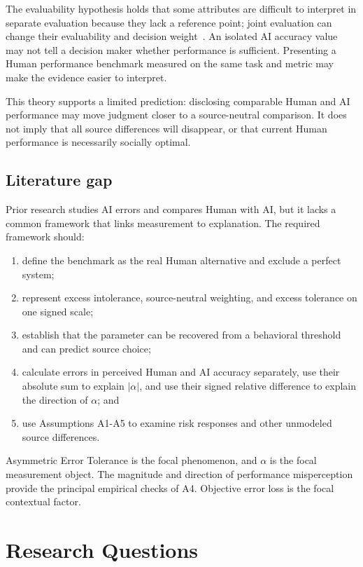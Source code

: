 \documentclass[11pt,a4paper]{article}
\begin{document}
The evaluability hypothesis holds that some attributes are difficult to interpret in separate evaluation because they lack a reference point; joint evaluation can change their evaluability and decision weight~\citep{hsee1996}. An isolated AI accuracy value may not tell a decision maker whether performance is sufficient. Presenting a Human performance benchmark measured on the same task and metric may make the evidence easier to interpret.

This theory supports a limited prediction: disclosing comparable Human and AI performance may move judgment closer to a source-neutral comparison. It does not imply that all source differences will disappear, or that current Human performance is necessarily socially optimal.

\subsection{Literature gap}

Prior research studies AI errors and compares Human with AI, but it lacks a common framework that links measurement to explanation. The required framework should:

\begin{enumerate}
\item define the benchmark as the real Human alternative and exclude a perfect system;
\item represent excess intolerance, source-neutral weighting, and excess tolerance on one signed scale;
\item establish that the parameter can be recovered from a behavioral threshold and can predict source choice;
\item calculate errors in perceived Human and AI accuracy separately, use their absolute sum to explain $|\alpha|$, and use their signed relative difference to explain the direction of $\alpha$; and
\item use Assumptions A1-A5 to examine risk responses and other unmodeled source differences.
\end{enumerate}

Asymmetric Error Tolerance is the focal phenomenon, and $\alpha$ is the focal measurement object. The magnitude and direction of performance misperception provide the principal empirical checks of A4. Objective error loss is the focal contextual factor.

\section{Research Questions}
\end{document}
